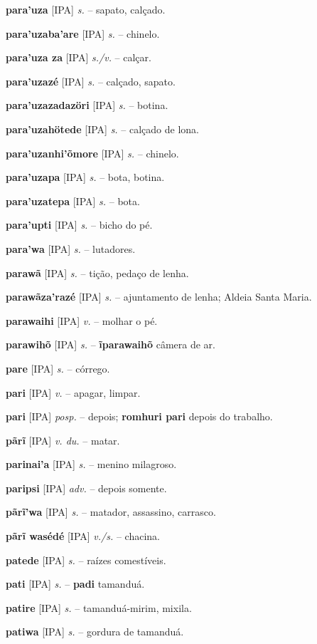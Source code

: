 \textbf{para'uza} [IPA] \textit{s.} -- sapato, calçado.

\textbf{para'uzaba'are} [IPA] \textit{s.} -- chinelo.

\textbf{para'uza za} [IPA] \textit{s./v.} -- calçar.

\textbf{para'uzazé} [IPA] \textit{s.} -- calçado, sapato.

\textbf{para'uzazadazöri} [IPA] \textit{s.} -- botina.

\textbf{para'uzahötede} [IPA] \textit{s.} -- calçado de lona.

\textbf{para'uzanhi'õmore} [IPA] \textit{s.} -- chinelo.

\textbf{para'uzapa} [IPA] \textit{s.} -- bota, botina.

\textbf{para'uzatepa} [IPA] \textit{s.} -- bota.

\textbf{para'upti} [IPA] \textit{s.} -- bicho do pé.

\textbf{para'wa} [IPA] \textit{s.} -- lutadores.

\textbf{parawã} [IPA] \textit{s.} -- tição, pedaço de lenha.

\textbf{parawãza'razé} [IPA] \textit{s.} -- ajuntamento de lenha; Aldeia Santa Maria.

\textbf{parawaihi} [IPA] \textit{v.} -- molhar o pé.

\textbf{parawihõ} [IPA] \textit{s.} -- \textbf{ĩparawaihõ} câmera de ar.

\textbf{pare} [IPA] \textit{s.} -- córrego.

\textbf{pari} [IPA] \textit{v.} -- apagar, limpar.

\textbf{pari} [IPA] \textit{posp.} -- depois; \textbf{romhuri pari} depois do trabalho.

\textbf{pãrĩ} [IPA] \textit{v. du.} -- matar.

\textbf{parinai'a} [IPA] \textit{s.} -- menino milagroso.

\textbf{paripsi} [IPA] \textit{adv.} -- depois somente.

\textbf{pãrĩ'wa} [IPA] \textit{s.} -- matador, assassino, carrasco.

\textbf{pãrĩ wasédé} [IPA] \textit{v./s.} -- chacina.

\textbf{patede} [IPA] \textit{s.} -- raízes comestíveis.

\textbf{pati} [IPA] \textit{s.} -- \textbf{padi} tamanduá.

\textbf{patire} [IPA] \textit{s.} -- tamanduá-mirim, mixila.

\textbf{patiwa} [IPA] \textit{s.} -- gordura de tamanduá.

